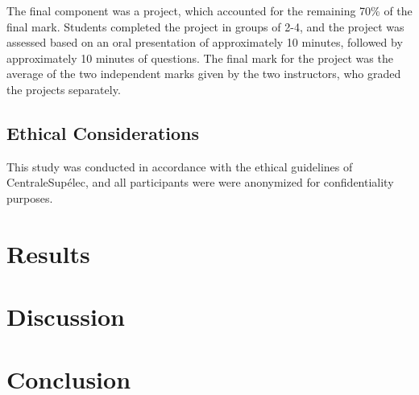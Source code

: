 \documentclass[a4paper]{article}
\begin{document}
The final component was a project, which accounted for the remaining 70\% of the final mark.
Students completed the project in groups of 2-4, and the project was assessed based on an oral presentation of approximately 10 minutes, followed by approximately 10 minutes of questions.
The final mark for the project was the average of the two independent marks given by the two instructors, who graded the projects separately.

\subsection{Ethical Considerations}
This study was conducted in accordance with the ethical guidelines of CentraleSupélec, and all participants were were anonymized for confidentiality purposes.

\section{Results}
\section{Discussion}
\section{Conclusion}
\end{document}
